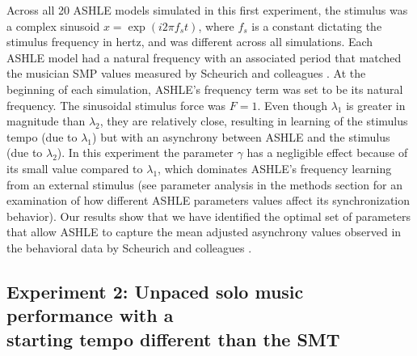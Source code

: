 \documentclass{report}
\begin{document}
Across all 20 ASHLE models simulated in this first experiment, the stimulus was a complex sinusoid $x=\exp(i2\pi f_s t)$, where $f_s$ is a constant dictating the stimulus frequency in hertz, and was different across all simulations. Each ASHLE model had a natural frequency with an associated period that matched the musician SMP values measured by Scheurich and colleagues \cite{scheurich2018tapping}. At the beginning of each simulation, ASHLE's frequency term was set to be its natural frequency. The sinusoidal stimulus force was $F=1$. Even though $\lambda_1$ is greater in magnitude than $\lambda_2$, they are relatively close, resulting in learning of the stimulus tempo (due to $\lambda_1$) but with an asynchrony between ASHLE and the stimulus (due to $\lambda_2$). In this experiment the parameter $\gamma$ has a negligible effect because of its small value compared to $\lambda_1$, which dominates ASHLE's frequency learning from an external stimulus (see parameter analysis in the methods section for an examination of how different ASHLE parameters values affect its synchronization behavior). Our results show that we have identified the optimal set of parameters that allow ASHLE to capture the mean adjusted asynchrony values observed in the behavioral data by Scheurich and colleagues \cite{scheurich2018tapping}.

\subsection{Experiment 2: Unpaced solo music performance with a \\ starting tempo different than the SMT}
\end{document}
